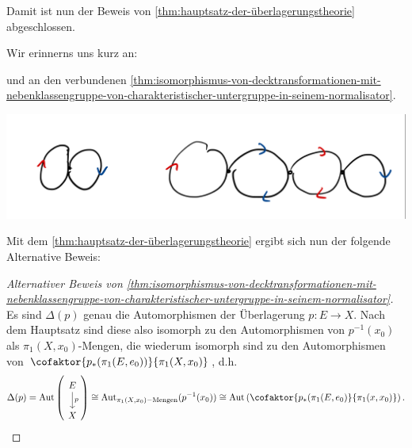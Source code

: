 Damit ist nun der Beweis von \autoref{thm:hauptsatz-der-überlagerungstheorie} abgeschlossen.

Wir erinnerns uns kurz an:



und an den verbundenen \autoref{thm:isomorphismus-von-decktransformationen-mit-nebenklassengruppe-von-charakteristischer-untergruppe-in-seinem-normalisator}.


\begin{minipage}{\textwidth}
    \centering
    \includegraphics[scale=0.25]{figures/handdrawn/skizze-nach-19.3}
\end{minipage}

Mit dem \autoref{thm:hauptsatz-der-überlagerungstheorie} ergibt sich nun der folgende Alternative Beweis:

\begin{proof}[Alternativer Beweis von \autoref{thm:isomorphismus-von-decktransformationen-mit-nebenklassengruppe-von-charakteristischer-untergruppe-in-seinem-normalisator}]
    
    Es sind $\Delta(p)$ genau die Automorphismen der Überlagerung  $p\colon  E \to X$. Nach dem Hauptsatz sind diese also isomorph zu den Automorphismen von $p^{-1} (x_0)$ als $\pi_1(X,x_0)$-Mengen, die wiederum isomorph sind zu den Automorphismen von $\cofaktor{p_*(\pi_1(E,e_0))}{\pi_1(X,x_0)}$, d.h.
\[
    \Delta(p) = \Aut \left(
    \begin{tikzcd}
        E \ar{d}{p} \\ X
    \end{tikzcd}\right) 
    \cong \Aut_{\pi_1(X,x_0)-\text{Mengen}} (p^{-1} (x_0)) \cong \Aut \left( \cofaktor{p_*(\pi_1(E,e_0)}{\pi_1(x,x_0)} \right) 
.\] 
\end{proof}


